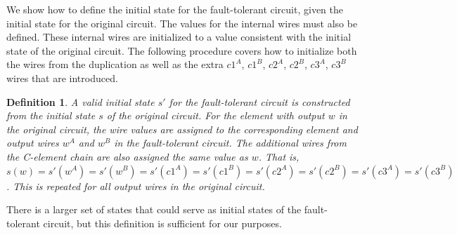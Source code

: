 \documentclass[12pt]{report}
\newtheorem*{definition}{Definition}
\begin{document}

We show how to define the initial state for the fault-tolerant circuit, given the initial state for the original circuit.  The values for the internal wires must also be defined.  These internal wires are initialized to a value consistent with the initial state of the original circuit.  The following procedure covers how to initialize both the wires from the duplication as well as the extra $c1^A$, $c1^B$, $c2^A$, $c2^B$, $c3^A$, $c3^B$ wires that are introduced.
\begin{definition} A {\em valid initial state} $s'$ for the fault-tolerant circuit is constructed from the initial state $s$ of the original circuit.  
For the element with output $w$ in the original circuit, the wire values are assigned to the corresponding element and output wires $w^A$ and $w^B$ in the fault-tolerant circuit.  The additional wires from the C-element chain are also assigned the same value as $w$.  That is, $s(w)=s'(w^A)=s'(w^B)=s'(c1^A)=s'(c1^B)=s'(c2^A)=s'(c2^B)=s'(c3^A)=s'(c3^B)$.  This is repeated for all output wires in the original circuit. 
\end{definition}
There is a larger set of states that could serve as initial states of the fault-tolerant circuit, but this definition is sufficient for our purposes.\\
\end{document}
